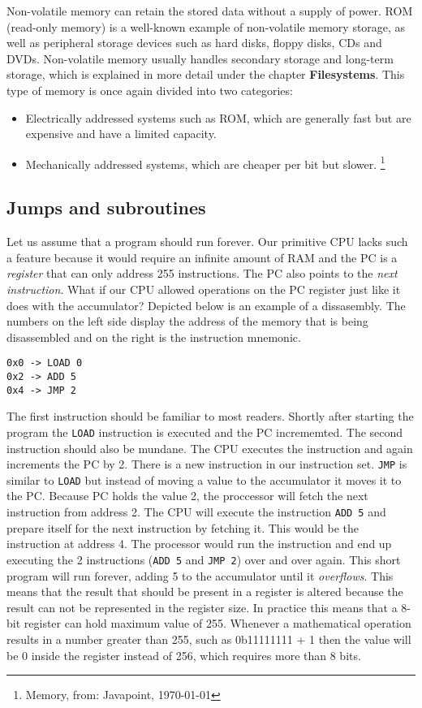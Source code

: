 Non-volatile memory can retain the stored data without a supply of power. ROM (read-only memory) is a well-known
example of non-volatile memory storage, as well as peripheral storage devices such as hard disks, floppy disks, CDs and 
DVDs. Non-volatile memory usually handles secondary storage and long-term storage, which is explained in more detail
under the chapter \textbf{Filesystems}. This type of memory is once again
divided into two categories:
\begin{itemize}
\item Electrically addressed systems such as ROM, which are generally fast but are expensive and
have a limited capacity. 
\item Mechanically addressed systems, which are cheaper per bit but slower. \footnote{Memory, from: Javapoint, \today }
\end{itemize}



\subsection{Jumps and subroutines}

Let us assume that a program should run forever. Our primitive CPU lacks such a feature because it
would require an infinite amount of RAM and the PC is a \textit{register} that can only address 255 
instructions. The PC also points to the \textit{next instruction}. What if our CPU allowed operations on
the PC register just like it does with the accumulator? Depicted below is an example of a 
dissasembly. The numbers on the left side display the address of the memory that is being
disassembled and on the right is the instruction mnemonic.
\begin{lstlisting}
0x0 -> LOAD 0
0x2 -> ADD 5
0x4 -> JMP 2
\end{lstlisting}
The first instruction should be familiar to most readers. Shortly after starting the program the 
\texttt{LOAD} instruction is executed and the PC incrememted. The second instruction should also be mundane.
The CPU executes the instruction and again increments the PC by 2. There is a new instruction in our 
instruction set. \texttt{JMP} is similar to \texttt{LOAD} but instead of
moving a value to the accumulator it moves it to the PC. Because PC holds the value 2, the
proccessor will fetch the next instruction from address 2. The CPU will execute the instruction
\texttt{ADD 5} and prepare itself for the next instruction by fetching it. This would be the instruction
at address 4. The processor would run the instruction and end up executing the 2 instructions
(\texttt{ADD 5} and \texttt{JMP 2}) over and over again. This short program will run forever, adding 5 to the
accumulator until it \textit{overflows}. This means that the result that should be present in a register
is altered because the result can not be represented in the register size. In practice this means
that a 8-bit register can hold maximum value of 255. Whenever a mathematical operation results in a 
number greater than 255, such as 0b11111111 + 1 then the value will be 0 inside the register instead
of 256, which requires more than 8 bits.

